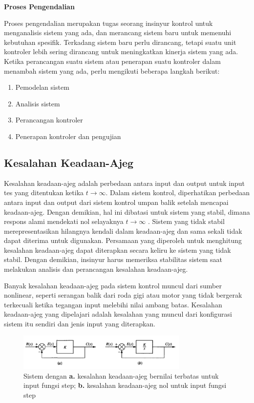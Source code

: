 \noindent\textbf{Proses Pengendalian}

Proses pengendalian merupakan tugas seorang insinyur kontrol untuk menganalisis sistem yang ada, dan merancang sistem baru untuk memenuhi kebutuhan spesifik. Terkadang sistem baru perlu dirancang, tetapi suatu unit kontroler lebih sering dirancang untuk meningkatkan kinerja sistem yang ada. Ketika perancangan suatu sistem atau penerapan suatu kontroler dalam menambah sistem yang ada, perlu mengikuti beberapa langkah berikut: \cite{ControlSystemBook}
\begin{enumerate}
	\item Pemodelan sistem
	\item Analisis sistem
	\item Perancangan kontroler
	\item Penerapan kontroler dan pengujian
\end{enumerate}

\subsection{Kesalahan Keadaan-Ajeg}

Kesalahan keadaan-ajeg adalah perbedaan antara input dan output untuk input tes yang ditentukan ketika $t \rightarrow \infty$. Dalam sistem kontrol, diperhatikan perbedaan antara input dan output dari sistem kontrol umpan balik setelah mencapai keadaan-ajeg. Dengan demikian, hal ini dibatasi untuk sistem yang stabil, dimana respons alami mendekati nol selayaknya $t \rightarrow \infty$ . Sistem yang tidak stabil merepresentasikan hilangnya kendali dalam keadaan-ajeg dan sama sekali tidak dapat diterima untuk digunakan. Persamaan yang diperoleh untuk menghitung kesalahan keadaan-ajeg dapat diterapkan secara keliru ke sistem yang tidak stabil. Dengan demikian, insinyur harus memeriksa stabilitas sistem saat melakukan analisis dan perancangan kesalahan keadaan-ajeg.

Banyak kesalahan keadaan-ajeg pada sistem kontrol muncul dari sumber nonlinear, seperti serangan balik dari roda gigi atau motor yang tidak bergerak terkecuali ketika tegangan input melebihi nilai ambang batas. Kesalahan keadaan-ajeg yang dipelajari adalah kesalahan yang muncul dari konfigurasi sistem itu sendiri dan jenis input yang diterapkan. 

\begin{figure}[!h]
	\centering
	\includegraphics[width=0.75\textwidth]{figures/SSEExample}
	\caption{Sistem dengan \textbf{a.} kesalahan keadaan-ajeg bernilai terbatas untuk input fungsi step; \textbf{b.} kesalahan keadaan-ajeg nol untuk input fungsi step \cite{ControlSystemBook}}
	\label{fig:3:steadystateerror}
\end{figure}

